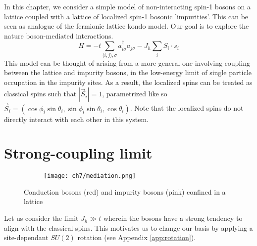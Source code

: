 In this chapter, we consider a simple model of non-interacting spin-1 bosons on a lattice coupled with a lattice of localized spin-1 bosonic 'impurities'. This can be seen as analogue of the fermionic lattice kondo model. Our goal is to explore the nature boson-mediated interactions. 
\begin{equation}
    H = -t\sum_{\langle i, j\rangle, \sigma} a_{i\sigma}^{\dagger}a_{j\sigma} - J_h \sum_i S_i \cdot s_i
\end{equation}
This model can be thought of arising from a more general one involving coupling between the lattice and impurity bosons, in the low-energy limit of single particle occupation in the impurity sites. As a result, the localized spins can be treated as classical spins such that $|\vec{S}_i| = 1$, parametrized like so $\vec{S}_i = (\cos\phi_i\sin\theta_i, \sin\phi_i\sin\theta_i, \cos\theta_i)$. Note that the localized spins do not directly interact with each other in this system.

\section{Strong-coupling limit}
\begin{figure}[!htb]
    \centering
    \begin{subfigure}[b]{\textwidth}  %
        \centering
        \texttt{[image: ch7/mediation.png]}
    \end{subfigure}
    \caption{Conduction bosons (red) and impurity bosons (pink) confined in a lattice}
    \label{}
\end{figure}
\FloatBarrier \!\!\!\!\!\!\!\!\!\!\!

Let us consider the limit $J_h \gg t$ wherein the bosons have a strong tendency to align with the classical spins. This motivates us to change our basis by applying a site-dependant $SU(2)$ rotation (see Appendix \ref{app:rotation}).

